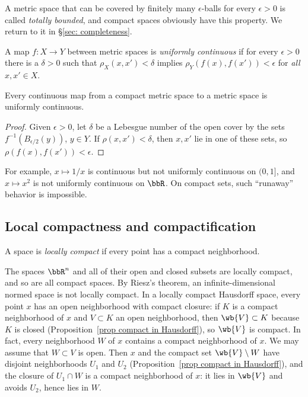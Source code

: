 A metric space that can be covered by finitely many $\epsilon$-balls for every $\epsilon>0$ is called \emph{totally bounded}, and compact spaces obviously have this property. We return to it in \S\ref{sec: completeness}.

\begin{defn}
    A map $f:X\to Y$ between metric spaces is \emph{uniformly continuous} if for every $\epsilon>0$ there is a $\delta>0$ such that $\rho_X(x,x')<\delta$ implies $\rho_Y(f(x),f(x'))<\epsilon$ for \emph{all} $x,x'\in X$.
\end{defn}

\begin{prop}\label{prop uniform continuity}
    Every continuous map from a compact metric space to a metric space is uniformly continuous.
\end{prop}
\begin{proof}
    Given $\epsilon>0$, let $\delta$ be a Lebesgue number of the open cover by the sets $f^{-1}(B_{\epsilon/2}(y))$, $y\in Y$. If $\rho(x,x')<\delta$, then $x,x'$ lie in one of these sets, so $\rho(f(x),f(x'))<\epsilon$.
\end{proof}

For example, $x\mapsto 1/x$ is continuous but not uniformly continuous on $(0,1]$, and $x\mapsto x^2$ is not uniformly continuous on $\bbR$. On compact sets, such ``runaway'' behavior is impossible.

\subsection{Local compactness and compactification}

\begin{defn}
    A space is \emph{locally compact} if every point has a compact neighborhood.
\end{defn}

The spaces $\bbR^n$ and all of their open and closed subsets are locally compact, and so are all compact spaces. By Riesz's theorem, an infinite-dimensional normed space is not locally compact. In a locally compact Hausdorff space, every point $x$ has an open neighborhood with compact closure: if $K$ is a compact neighborhood of $x$ and $V\subset K$ an open neighborhood, then $\wb{V}\subset K$ because $K$ is closed (Proposition~\ref{prop compact in Hausdorff}), so $\wb{V}$ is compact. In fact, every neighborhood $W$ of $x$ contains a compact neighborhood of $x$. We may assume that $W\subset V$ is open. Then $x$ and the compact set $\wb{V}\setminus W$ have disjoint neighborhoods $U_1$ and $U_2$ (Proposition~\ref{prop compact in Hausdorff}), and the closure of $U_1\cap W$ is a compact neighborhood of $x$: it lies in $\wb{V}$ and avoids $U_2$, hence lies in $W$.

